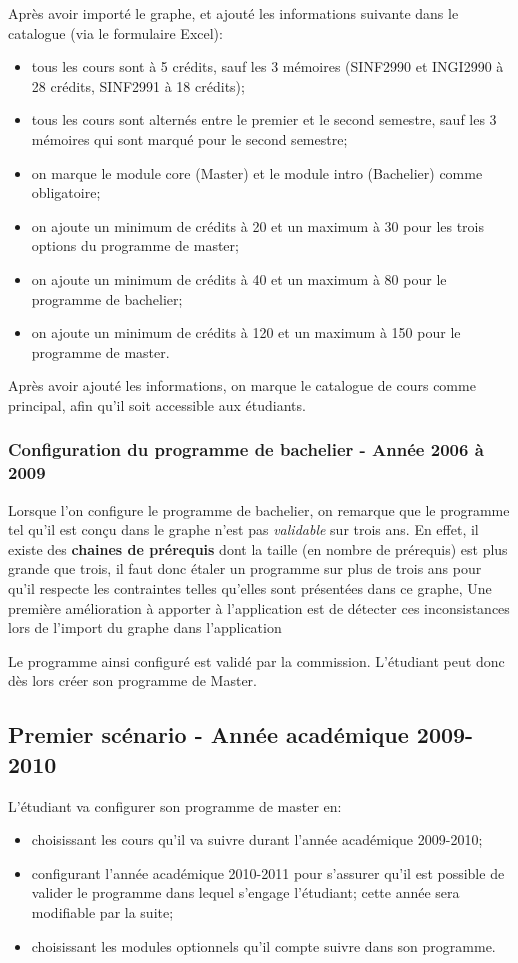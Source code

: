 Après avoir importé le graphe, et ajouté les informations suivante dans le catalogue (via le formulaire Excel):
\begin{itemize}
\item tous les cours sont à 5 crédits, sauf les 3 mémoires (SINF2990 et INGI2990 à 28 crédits, SINF2991 à 18 crédits);
\item tous les cours sont alternés entre le premier et le second semestre, sauf les 3 mémoires qui sont marqué pour le second semestre;
\item on marque le module core (Master) et le module intro (Bachelier) comme obligatoire;
\item on ajoute un minimum de crédits à 20 et un maximum à 30 pour les trois options du programme de master;
\item on ajoute un minimum de crédits à 40 et un maximum à 80 pour le programme de bachelier;
\item on ajoute un minimum de crédits à 120 et un maximum à 150 pour le programme de master.
\end{itemize}   

Après avoir ajouté les informations, on marque le catalogue de cours comme principal, afin qu'il soit accessible aux étudiants.


\subsubsection{Configuration du programme de bachelier - Année 2006 à 2009}
Lorsque l'on configure le programme de bachelier, on remarque que le programme tel qu'il est conçu dans le graphe n'est pas \textit{validable} sur trois ans. En effet, il existe des \textbf{chaines de prérequis} dont la taille (en nombre de prérequis) est plus grande que trois, il faut donc étaler un programme sur plus de trois ans pour qu'il respecte les contraintes telles qu'elles sont présentées dans ce graphe, Une première amélioration à apporter à l'application est de détecter ces inconsistances lors de l'import du graphe dans l'application

Le programme ainsi configuré est validé par la commission. L'étudiant peut donc dès lors créer son programme de Master. 
\subsection{Premier scénario - Année académique 2009-2010}
L'étudiant va configurer son programme de master en:
\begin{itemize}
\item choisissant les cours qu'il va suivre durant l'année académique 2009-2010;

\item configurant l'année académique 2010-2011 pour s'assurer qu'il est possible de valider le programme dans lequel s'engage l'étudiant; cette année sera modifiable par la suite;

\item choisissant les modules optionnels qu'il compte suivre dans son programme.
\end{itemize}

